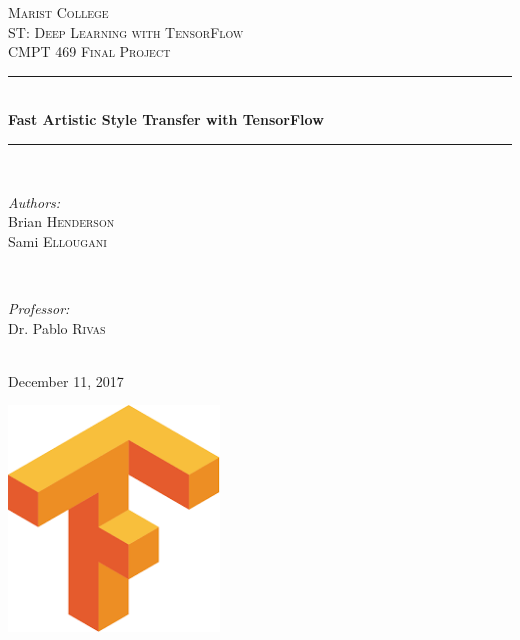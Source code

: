 \documentclass[12pt]{article}
\begin{document}
\begin{titlepage}

\newcommand{\HRule}{\rule{\linewidth}{0.5mm}} %

\center 
\textsc{\LARGE Marist College}\\[1.5cm]
\textsc{\Large ST: Deep Learning with TensorFlow}\\[0.5cm] 
\textsc{\large CMPT 469 Final Project}\\[0.5cm] 

\HRule \\[0.4cm]
{ \huge \bfseries Fast Artistic Style Transfer with TensorFlow}\\[0.4cm]
\HRule \\[1.5cm]
 
\begin{minipage}{0.4\textwidth}
\begin{flushleft} \large
\emph{Authors:}\\
Brian \textsc{Henderson} %
\\
Sami \textsc{Ellougani} %
\end{flushleft}
\end{minipage}
~
\begin{minipage}{0.4\textwidth}
\begin{flushright} \large
\emph{Professor:} \\
Dr. Pablo \textsc{Rivas} %
\end{flushright}
\end{minipage}\\[2cm]

{\large December 11, 2017}\\[2cm]

\begin{center}
  \includegraphics[height=60mm]{visuals/tf.png}
\end{center}


\end{titlepage}
\end{document}
